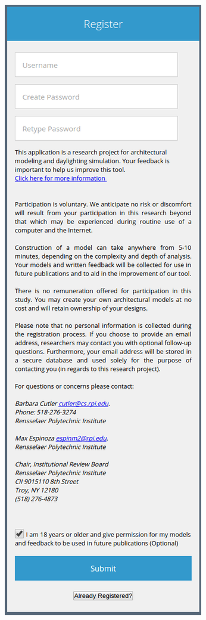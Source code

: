 \documentclass[12pt]{article}
\begin{document}
\begin{figure}[h]
  \begin{subfigure}{.5\textwidth}
    \centering
    \includegraphics[scale=0.4]{ss_reg}
  \end{subfigure}%

\end{figure}
\end{document}
